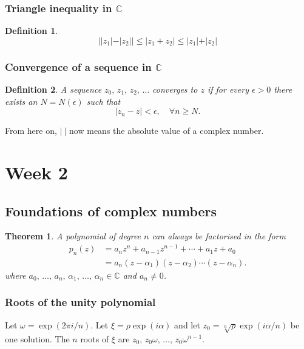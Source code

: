 \documentclass{article}
\newtheorem{theorem}{Theorem}
\newtheorem{definition}{Definition}
\begin{document}
\subsubsection{Triangle inequality in $\mathbb{C}$}
\begin{definition}
    \begin{equation}
        \vert \vert z_1\vert - \vert z_2 \vert \vert \leq  \vert z_1 +z_2 \vert \leq \vert z_1\vert + \vert z_2 \vert
    \end{equation}
\end{definition}

\subsubsection{Convergence of a sequence in $\mathbb{C}$}
\begin{definition}
    A sequence $z_0,\,z_1,\,z_2,\,\ldots$ converges to $z$ if for every $\epsilon>0$ there exists an $N=N(\epsilon)$ such that
    \begin{equation}
        \vert z_n-z\vert<\epsilon,\quad \forall n\geq N.
    \end{equation}
\end{definition}
From here on, $\vert \ \vert$ now means the absolute value of a complex number.

\section{Week 2}
\subsection{Foundations of complex numbers}
\begin{theorem}
    A polynomial of degree $n$ can always be factorised in the form
    \begin{align}
        p_n(z)&=a_nz^n+a_{n-1}z^{n-1}+\cdots+a_1z+a_0 \\
        &= a_n(z-\alpha_1)(z-\alpha_2)\cdots(z-\alpha_n).
    \end{align}
    where $a_0,\,\ldots,\,a_n,\,\alpha_1,\,\ldots,\,\alpha_n\in\mathbb{C}$ and $a_n\neq0$.
\end{theorem}

\subsubsection{Roots of the unity polynomial}
Let $\omega=\exp(2\pi i/n)$. Let $\xi=\rho\exp(i\alpha)$ and let $z_0=\sqrt[n]{\rho}\exp(i\alpha/n)$ be one solution. The $n$ roots of $\xi$ are $z_0,\,z_0\omega,\,\ldots,\,z_0\omega^{n-1}$.
\end{document}
